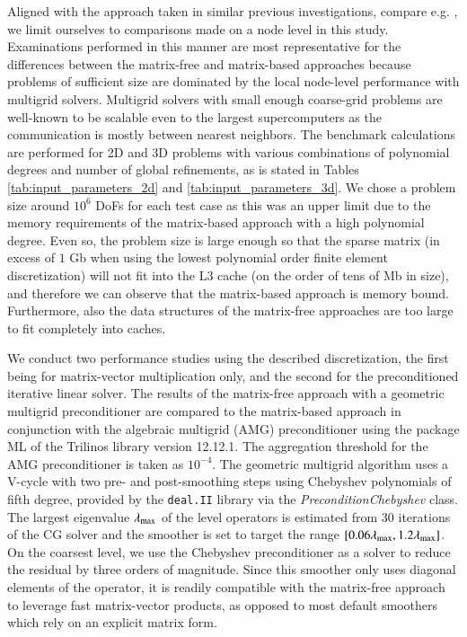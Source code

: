 \documentclass[AMA,STIX1COL]{WileyNJD-v2}
\begin{document}
Aligned with the approach taken in similar previous investigations, compare e.g. \cite{kronbichler2017fast},
we limit ourselves to comparisons made on a node level in this study.
{\color{red}
Examinations performed in this manner are most representative for the differences between the matrix-free and matrix-based approaches because problems of sufficient size are dominated by the local node-level performance with multigrid solvers. Multigrid solvers with small enough coarse-grid problems are well-known to be scalable even to the largest supercomputers \cite{gholami2016,ibeid2018} as the communication is mostly between nearest neighbors.
}
The benchmark calculations are performed for 2D and 3D problems with various combinations of polynomial degrees and number of global refinements, as is stated in Tables \ref{tab:input_parameters_2d} and \ref{tab:input_parameters_3d}.
We chose a problem size around $10^6$ DoFs for each test case as this was an upper limit due to the memory requirements of the matrix-based approach with a high polynomial degree.
Even so, the problem size is large enough so that the sparse matrix (in excess of $1$ Gb when using the lowest polynomial order finite element discretization) will not fit into the L3 cache (on the order of tens of Mb in size), and therefore we can observe that the matrix-based approach is memory bound. Furthermore, also the data structures of the matrix-free approaches are too large to fit completely into caches.

We conduct two performance studies using the described discretization, the first being for matrix-vector multiplication only, and the second for the preconditioned iterative linear solver.
The results of the matrix-free approach with a geometric multigrid preconditioner are compared to the matrix-based approach in conjunction with the algebraic multigrid (AMG) preconditioner using the package ML \cite{Gee2006a} of the Trilinos \cite{Heroux2005} library version 12.12.1.
The aggregation threshold for the AMG preconditioner is taken as $10^{-4}$.
The geometric multigrid algorithm uses a V-cycle with two pre- and post-smoothing steps using Chebyshev polynomials \cite{Varga2009} of fifth degree, provided
by the \texttt{deal.II} library via the \textit{PreconditionChebyshev} class.
The largest eigenvalue $\lambda_{\rm{max}}$ of the level operators is estimated from $30$ iterations of the CG solver and the smoother
is set to target the range $[0.06\lambda_{\rm{max}}, 1.2\lambda_{\rm{max}}]$.
On the coarsest level, we use the Chebyshev preconditioner as a solver \cite{Varga2009} to reduce the residual by three orders of magnitude.
Since this smoother only uses diagonal elements of the operator, it is readily compatible with the matrix-free approach to leverage fast matrix-vector products, as opposed to most default smoothers which rely on an explicit matrix form.
\end{document}
